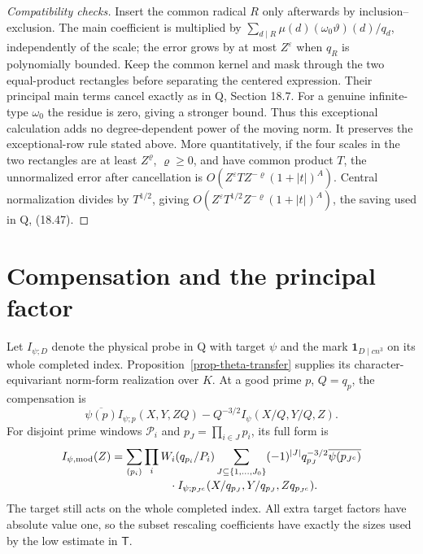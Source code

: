 \documentclass[11pt,a4paper]{article}
\theoremstyle{remark}\newtheorem{remark}[theorem]{Remark}
\newcommand{\eps}{\varepsilon}
\newcommand{\one}{\mathbf 1}
\numberwithin{equation}{section}
\begin{document}
\begin{proof}[Compatibility checks]
Insert the common radical $R$ only afterwards by
inclusion--exclusion. The main coefficient is multiplied by
$\sum_{d\mid R}\mu(d)(\omega_0\vartheta)(d)/q_d$,
independently of the scale; the error grows by at most $Z^\eps$
when $q_R$ is polynomially bounded. Keep the common kernel and
mask through the two equal-product rectangles before separating
the centered expression. Their principal main terms cancel
exactly as in Q, Section 18.7. For a genuine infinite-type
$\omega_0$ the residue is zero, giving a stronger bound.
Thus this exceptional calculation adds no degree-dependent
power of the moving norm. It preserves the exceptional-row
rule stated above.
More quantitatively, if the four scales in the two rectangles
are at least $Z^\varrho$, $\varrho\ge0$, and have common
product $T$, the unnormalized error after cancellation is
$O(Z^\eps T Z^{-\varrho}(1+|t|)^A)$.
Central normalization divides by $T^{1/2}$, giving
$O(Z^\eps T^{1/2}Z^{-\varrho}(1+|t|)^A)$, the saving
used in Q, (18.47).
\end{proof}

\section{Compensation and the principal factor}\label{sec-probe}

Let $I_{\psi;D}$ denote the physical probe in Q with target
$\psi$ and the mark $\one_{D\mid cn^3}$ on its whole
completed index. Proposition~\ref{prop-theta-transfer} supplies its character-equivariant
norm-form realization over $K$. At a good prime $p$,
$Q=q_p$, the compensation is
\begin{equation}\label{eq-comp-one}
 \overline{\psi(p)}I_{\psi;p}(X,Y,ZQ)
       -Q^{-3/2}I_\psi(X/Q,Y/Q,Z).
\end{equation}
For disjoint prime windows $\mathcal P_i$ and
$p_J=\prod_{i\in J}p_i$, its full form is
\begin{align}\label{eq-comp-full}
 I_{\psi,\mathrm{mod}}(Z)
 =\sum_{(p_i)}\prod_iW_i(q_{p_i}/P_i)
 \sum_{J\subseteq\{1,\ldots,J_0\}}&
       (-1)^{|J|}q_{p_J}^{-3/2}\overline{\psi(p_{J^c})}
       \nonumber\\[-2pt]
 &\hspace{-30mm}\cdot I_{\psi;p_{J^c}}
       (X/q_{p_J},Y/q_{p_J},Zq_{p_{J^c}}).
\end{align}
The target still acts on the whole completed index. All extra
target factors have absolute value one, so the subset rescaling
coefficients have exactly the sizes used by the low estimate
in $\mathsf T$.
\end{document}
